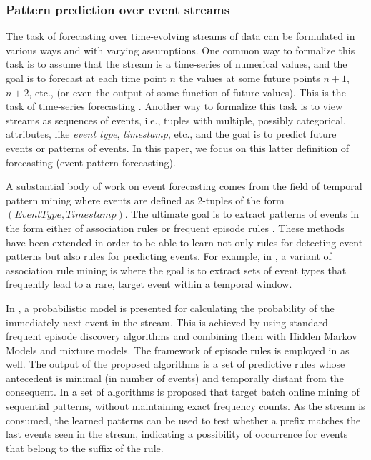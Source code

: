

\subsubsection*{Pattern prediction over event streams}

\par The task of forecasting over time-evolving streams of data can be formulated in various ways and with varying assumptions.
One common way to formalize this task is to assume that the stream is a time-series of numerical values, and the goal is to forecast at each time point $n$ the values at some future points $n+1$, $n+2$, etc., (or even the output of some function of future values). 
This is the task of time-series forecasting \cite{montgomery_introduction_2015}.
Another way to formalize this task is to view streams as sequences of events,
i.e., tuples with multiple, possibly categorical, attributes, like \textit{event type}, \textit{timestamp}, etc., and the goal is to predict future events or patterns of events. In this paper, we focus on this latter definition of forecasting (event pattern forecasting).  

\par A substantial body of work on event forecasting comes from the field of temporal pattern mining where events are defined as 2-tuples of the form $(\mathit{EventType},\mathit{Timestamp})$.
The ultimate goal is to extract patterns of events in the form either of association rules \cite{agrawal_mining_1993} or frequent episode rules \cite{mannila_discovery_1997}. 
These methods have been extended in order to be able to learn not only rules for detecting event patterns but also rules for predicting events.
For example, in \cite{vilalta_predicting_2002}, a variant of association rule mining is where the goal is to extract sets of event types that frequently lead to a rare, target event within a temporal window. 
\par In \cite{laxman_stream_2008}, a probabilistic model is presented
for calculating the probability of the immediately next event in the stream. 
This is achieved by using standard frequent episode discovery algorithms and combining them with Hidden Markov Models and mixture models.
The framework of episode rules is employed in \cite{fahed_efficient_2014} as well.
The output of the proposed algorithms is a set of predictive rules whose antecedent is minimal (in number of events) and temporally distant from the consequent.
In \cite{zhou_pattern_2015} a set of algorithms is proposed that target batch online mining of sequential patterns, without maintaining exact frequency counts.
As the stream is consumed, the learned patterns can be used to test whether a prefix matches the last events seen in the stream, indicating a possibility of occurrence for events that belong to the suffix of the rule.

